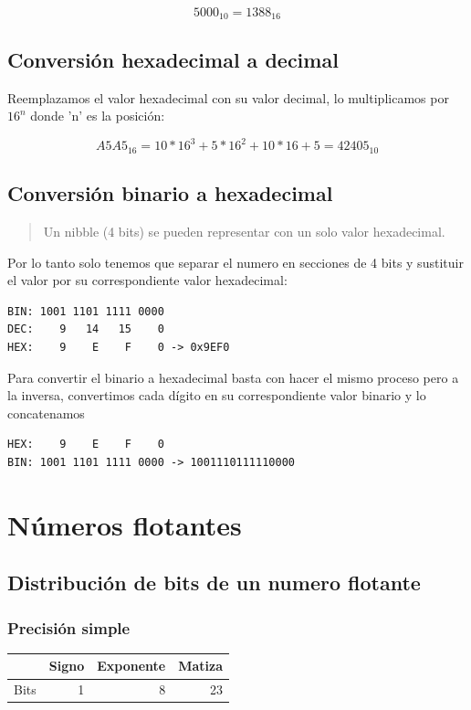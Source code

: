 \documentclass[11pt]{article}
\begin{document}
\[ 5000_{10} = 1388_{16} \]

\subsection{Conversión hexadecimal a decimal}
\label{sec:orgfb88632}
Reemplazamos el valor hexadecimal con su valor decimal, lo multiplicamos por \(16^n\) donde 'n' es la posición:

\[ A5A5_{16} = 10*16^3 + 5*16^2 + 10*16 + 5 = 42405_{10} \]

\subsection{Conversión binario a hexadecimal}
\label{sec:org6d7bb68}
\begin{verse}
Un nibble (4 bits) se pueden representar con un solo valor hexadecimal.\\
\end{verse}

Por lo tanto solo tenemos que separar el numero en secciones de 4 bits y sustituir el valor por su correspondiente valor hexadecimal:

\begin{verbatim}
BIN: 1001 1101 1111 0000 
DEC:    9   14   15    0
HEX:    9    E    F    0 -> 0x9EF0
\end{verbatim}

Para convertir el binario a hexadecimal basta con hacer el mismo proceso pero a la inversa, convertimos cada dígito en su correspondiente valor binario y lo concatenamos 

\begin{verbatim}
HEX:    9    E    F    0 
BIN: 1001 1101 1111 0000 -> 1001110111110000
\end{verbatim}

\section{Números flotantes}
\label{sec:org66c89ea}
\subsection{Distribución de bits de un numero flotante}
\label{sec:org2729c53}
\subsubsection*{Precisión simple}
\label{sec:org3782412}
\begin{center}
\begin{tabular}{|l|r|r|r|}
\hline
 & Signo & Exponente & Matiza\\
\hline
Bits & 1 & 8 & 23\\
\hline
\end{tabular}
\end{center}
\end{document}
